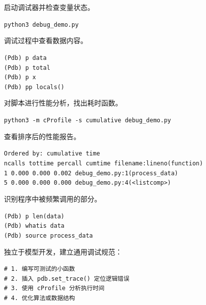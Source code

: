 \documentclass[a4paper, 12pt]{article}
\begin{document}
\begin{tcolorbox}[instancestyle, title=实例4：运行 pdb 调试脚本]
启动调试器并检查变量状态。

\texttt{python3 debug\_demo.py}
\end{tcolorbox}

\begin{tcolorbox}[instancestyle, title=实例5：在 pdb 中检查变量值]
调试过程中查看数据内容。

\texttt{(Pdb) p data} \\
\texttt{(Pdb) p total} \\
\texttt{(Pdb) p x} \\
\texttt{(Pdb) pp locals()}
\end{tcolorbox}

\begin{tcolorbox}[instancestyle, title=实例6：使用 cProfile 分析性能]
对脚本进行性能分析，找出耗时函数。

\texttt{python3 -m cProfile -s cumulative debug\_demo.py}
\end{tcolorbox}

\begin{tcolorbox}[instancestyle, title=实例7：解读 cProfile 输出]
查看排序后的性能报告。

\texttt{Ordered by: cumulative time} \\
\texttt{ncalls  tottime  percall  cumtime  filename:lineno(function)} \\
\texttt{1    0.000    0.000    0.002    debug\_demo.py:1(process\_data)} \\
\texttt{5    0.000    0.000    0.000    debug\_demo.py:4(<listcomp>)}
\end{tcolorbox}

\begin{tcolorbox}[instancestyle, title=实例8：cProfile 分析函数调用]
识别程序中被频繁调用的部分。

\texttt{(Pdb) p len(data)} \\
\texttt{(Pdb) whatis data} \\
\texttt{(Pdb) source process\_data}
\end{tcolorbox}

\begin{tcolorbox}[instancestyle, title=实例9：综合调试与性能流程]
独立于模型开发，建立通用调试规范：

\texttt{\# 1. 编写可测试的小函数} \\
\texttt{\# 2. 插入 pdb.set\_trace() 定位逻辑错误} \\
\texttt{\# 3. 使用 cProfile 分析执行时间} \\
\texttt{\# 4. 优化算法或数据结构}
\end{tcolorbox}
\end{document}
